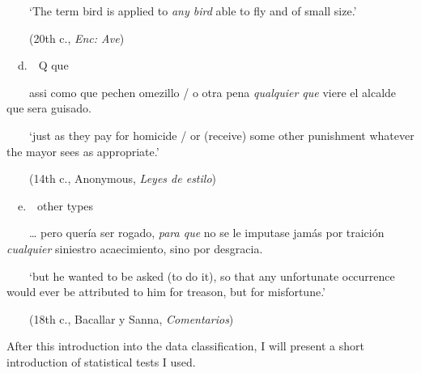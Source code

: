 \begin{styleStandard}
\ \ \ \ ‘The term bird is applied to \textit{any bird} able to fly and of small size.’
\end{styleStandard}

\begin{styleStandard}
\ \ \ \ (20th c., \textit{Enc: Ave})
\end{styleStandard}

\begin{styleStandard}
\ \ d.\ \ Q que
\end{styleStandard}

\begin{styleStandard}
\ \ \ \ assi como que pechen omezillo / o otra pena \textit{qualquier que} viere el alcalde que sera guisado. 
\end{styleStandard}

\begin{styleStandard}
\ \ \ \ ‘just as they pay for homicide / or (receive) some other punishment whatever the mayor sees as appropriate.’
\end{styleStandard}

\begin{styleStandard}
\ \ \ \ (14th c., Anonymous, \textit{Leyes de estilo})
\end{styleStandard}

\begin{styleStandard}
\ \ e.\ \ other types
\end{styleStandard}

\begin{styleStandard}
\ \ \ \ … pero quería ser rogado, \textit{para que} no se le imputase jamás por traición \textit{cualquier} siniestro acaecimiento, sino por desgracia. 
\end{styleStandard}

\begin{styleStandard}
\ \ \ \ ‘but he wanted to be asked (to do it), so that any unfortunate occurrence would ever be attributed to him for treason, but for misfortune.’
\end{styleStandard}

\begin{styleStandard}
\ \ \ \ (18th c., Bacallar y Sanna,\textit{ Comentarios})
\end{styleStandard}

\begin{styleStandard}
After this introduction into the data classification, I will present a short introduction of statistical tests I used.
\end{styleStandard}

